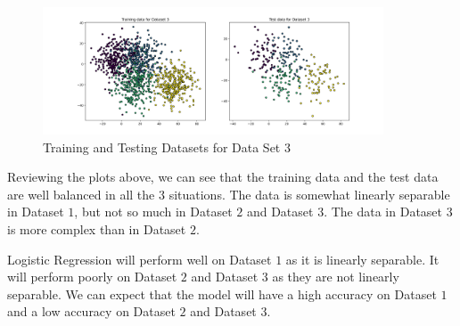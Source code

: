 \begin{figure}[H]
    \centering
    \includegraphics[width=0.9\textwidth]{Images/dataset-3-train-test.png}
    \caption{Training and Testing Datasets for Data Set 3}
\end{figure}

\clearpage

Reviewing the plots above, we can see that the training data and the test data are well balanced in all the $3$ situations. The data is somewhat linearly separable in Dataset $1$, but not so much in Dataset $2$ and Dataset $3$. The data in Dataset $3$ is more complex than in Dataset $2$.

Logistic Regression will perform well on Dataset $1$ as it is linearly separable. It will perform poorly on Dataset $2$ and Dataset $3$ as they are not linearly separable. We can expect that the model will have a high accuracy on Dataset $1$ and a low accuracy on Dataset $2$ and Dataset $3$.





